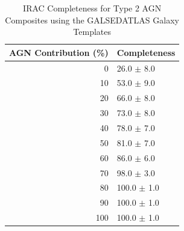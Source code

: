 \begin{appendices}
\begin{table}[h]
\centering
\begin{tabular}{rl}
\hline
AGN Contribution (\%) & Completeness \\
\hline
0 & 26.0 $\pm$ 8.0 \\
10 & 53.0 $\pm$ 9.0 \\
20 & 66.0 $\pm$ 8.0 \\
30 & 73.0 $\pm$ 8.0 \\
40 & 78.0 $\pm$ 7.0 \\
50 & 81.0 $\pm$ 7.0 \\
60 & 86.0 $\pm$ 6.0 \\
70 & 98.0 $\pm$ 3.0 \\
80 & 100.0 $\pm$ 1.0 \\
90 & 100.0 $\pm$ 1.0 \\
100 & 100.0 $\pm$ 1.0 \\
\hline
\end{tabular}
\caption{IRAC Completeness for Type 2 AGN Composites using the GALSEDATLAS Galaxy Templates}
\end{table}

\end{appendices}